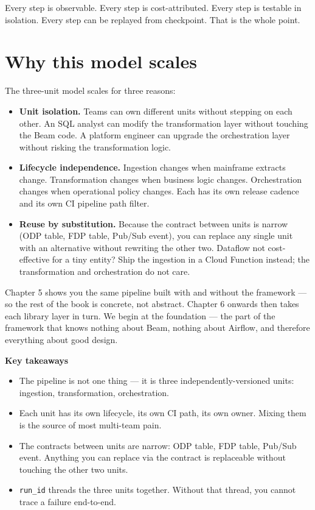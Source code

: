 \documentclass[
  11pt,
  british,
  oneside]{book}
\providecommand{\tightlist}{%
  \setlength{\itemsep}{0pt}\setlength{\parskip}{0pt}}
\begin{document}
Every step is observable. Every step is cost-attributed. Every step is
testable in isolation. Every step can be replayed from checkpoint. That
is the whole point.

\hypertarget{why-this-model-scales}{%
\section{Why this model scales}\label{why-this-model-scales}}

The three-unit model scales for three reasons:

\begin{itemize}
\tightlist
\item
  \textbf{Unit isolation.} Teams can own different units without
  stepping on each other. An SQL analyst can modify the transformation
  layer without touching the Beam code. A platform engineer can upgrade
  the orchestration layer without risking the transformation logic.
\item
  \textbf{Lifecycle independence.} Ingestion changes when mainframe
  extracts change. Transformation changes when business logic changes.
  Orchestration changes when operational policy changes. Each has its
  own release cadence and its own CI pipeline path filter.
\item
  \textbf{Reuse by substitution.} Because the contract between units is
  narrow (ODP table, FDP table, Pub/Sub event), you can replace any
  single unit with an alternative without rewriting the other two.
  Dataflow not cost-effective for a tiny entity? Ship the ingestion in a
  Cloud Function instead; the transformation and orchestration do not
  care.
\end{itemize}

Chapter 5 shows you the same pipeline built with and without the
framework --- so the rest of the book is concrete, not abstract. Chapter
6 onwards then takes each library layer in turn. We begin at the
foundation --- the part of the framework that knows nothing about Beam,
nothing about Airflow, and therefore everything about good design.

\begin{takeaways}
\textbf{Key takeaways}
\begin{itemize}
  \item The pipeline is not one thing — it is three independently-versioned units: ingestion, transformation, orchestration.
  \item Each unit has its own lifecycle, its own CI path, its own owner. Mixing them is the source of most multi-team pain.
  \item The contracts between units are narrow: ODP table, FDP table, Pub/Sub event. Anything you can replace via the contract is replaceable without touching the other two units.
  \item \texttt{run\_id} threads the three units together. Without that thread, you cannot trace a failure end-to-end.
\end{itemize}
\end{takeaways}
\end{document}
